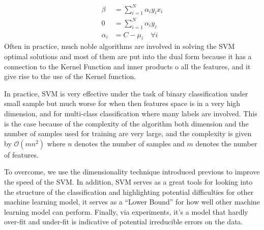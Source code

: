 \documentclass{article}
\begin{document}
        \begin{align*}\tag{8}\label{eqn:8}
            \beta &= \sum_{i = 1}^{N}\alpha_i y_i x_i 
            \\
            0 &= \sum_{i = 1}^{N}\alpha_i y_i
            \\
            \alpha_i &= C - \mu_i \quad \forall i
        \end{align*}
        Often in practice, much noble algorithms are involved in solving the SVM optimal solutions and most of them are put into the dual form because it has a connection to the Kernel Function and inner products o all the features, and it give rise to the use of the Kernel function. 
        \par
        In practice, SVM is very effective under the task of binary classification under small sample but much worse for when then features space is in a very high dimension, and for multi-class classification where many labels are involved. This is the case because of the complexity of the algorithm both dimension and the number of samples used for training are very large, and the complexity is given by $\mathcal{O}(mn^2)$ where $n$ denotes the number of samples and $m$ denotes the number of features. 
        \par
        To overcome, we use the dimensionality technique introduced previous to improve the speed of the SVM. In addition, SVM serves as a great tools for looking into the structure of the classification and highlighting potential difficulties for other machine learning model, it serves as a ``Lower Bound'' for how well other machine learning model can perform. Finally, via experiments, it's a model that hardly over-fit and under-fit is indicative of potential irreducible errors on the data.
\end{document}
